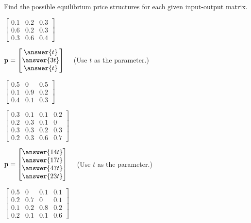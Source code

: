 \documentclass{ximera}
\begin{document}
\begin{problem}\label{prob:i/o_1}
Find the possible equilibrium price structures for each given input-output matrix.
\begin{problem}

$\begin{bmatrix}
0.1 & 0.2 & 0.3 \\
0.6 & 0.2 & 0.3 \\
0.3 & 0.6 & 0.4
\end{bmatrix}$

${\bf p}=\begin{bmatrix}
\answer{t} \\
\answer{3t} \\
\answer{t}
\end{bmatrix} \quad$ (Use $t$ as the parameter.)
\end{problem}

\begin{problem}\label{prob:i/o_2}
$\begin{bmatrix}
0.5 & 0 & 0.5 \\
0.1 & 0.9 & 0.2 \\
0.4 & 0.1 & 0.3
\end{bmatrix}$
\end{problem}

\begin{problem}\label{prob:i/o_3}
$\begin{bmatrix}
0.3 & 0.1 & 0.1 & 0.2 \\
0.2 & 0.3 & 0.1 & 0 \\
0.3 & 0.3 & 0.2 & 0.3 \\
0.2 & 0.3 & 0.6 & 0.7
\end{bmatrix}$

${\bf p}=\begin{bmatrix}
\answer{14t} \\
\answer{17t} \\
\answer{47t} \\
\answer{23t}
\end{bmatrix} \quad$ (Use $t$ as the parameter.)
\end{problem}



\begin{problem}\label{prob:i/o_4}
$\begin{bmatrix}
0.5 & 0 & 0.1 & 0.1 \\
0.2 & 0.7 & 0 & 0.1 \\
0.1 & 0.2 & 0.8 & 0.2 \\
0.2 & 0.1 & 0.1 & 0.6
\end{bmatrix}$
\end{problem}

\end{problem}
\end{document}
